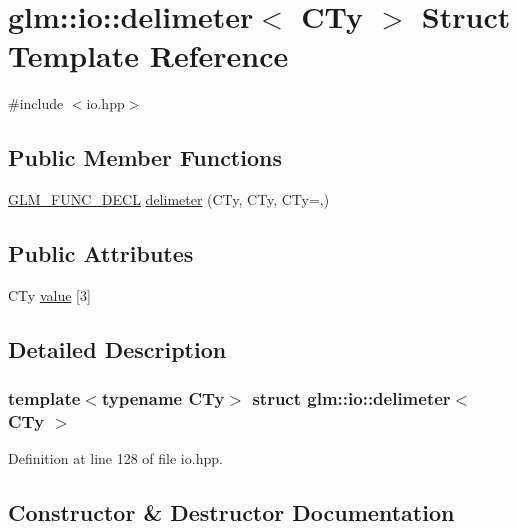 \hypertarget{structglm_1_1io_1_1delimeter}{}\section{glm\+::io\+::delimeter$<$ C\+Ty $>$ Struct Template Reference}
\label{structglm_1_1io_1_1delimeter}


{\ttfamily \#include $<$io.\+hpp$>$}

\subsection*{Public Member Functions}
\begin{DoxyCompactItemize}
\item 
\mbox{\hyperlink{setup_8hpp_ab2d052de21a70539923e9bcbf6e83a51}{G\+L\+M\+\_\+\+F\+U\+N\+C\+\_\+\+D\+E\+CL}} \mbox{\hyperlink{structglm_1_1io_1_1delimeter_a5c1db62fae08a4c96eaf336781a4b53d}{delimeter}} (C\+Ty, C\+Ty, C\+Ty=\textquotesingle{},\textquotesingle{})
\end{DoxyCompactItemize}
\subsection*{Public Attributes}
\begin{DoxyCompactItemize}
\item 
C\+Ty \mbox{\hyperlink{structglm_1_1io_1_1delimeter_a9ade129dae50c4f716f724e7425f9c68}{value}} \mbox{[}3\mbox{]}
\end{DoxyCompactItemize}


\subsection{Detailed Description}
\subsubsection*{template$<$typename C\+Ty$>$\newline
struct glm\+::io\+::delimeter$<$ C\+Ty $>$}



Definition at line 128 of file io.\+hpp.



\subsection{Constructor \& Destructor Documentation}
\mbox{\label{structglm_1_1io_1_1delimeter_a5c1db62fae08a4c96eaf336781a4b53d}} 
